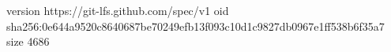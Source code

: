 version https://git-lfs.github.com/spec/v1
oid sha256:0e644a9520c8640687be70249efb13f093c10d1c9827db0967e1ff538b6f35a7
size 4686
